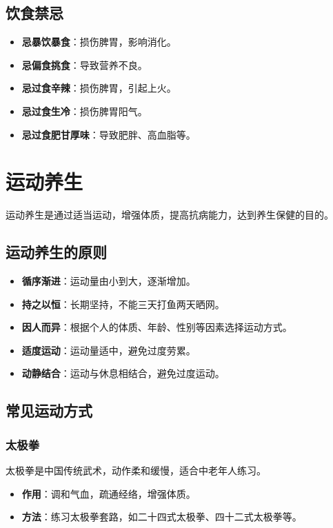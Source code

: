 \documentclass[12pt,UTF8]{ctexbook}
\begin{document}
\subsection{饮食禁忌}

\begin{itemize}
\item \textbf{忌暴饮暴食}：损伤脾胃，影响消化。
\item \textbf{忌偏食挑食}：导致营养不良。
\item \textbf{忌过食辛辣}：损伤脾胃，引起上火。
\item \textbf{忌过食生冷}：损伤脾胃阳气。
\item \textbf{忌过食肥甘厚味}：导致肥胖、高血脂等。
\end{itemize}

\section{运动养生}

运动养生是通过适当运动，增强体质，提高抗病能力，达到养生保健的目的。

\subsection{运动养生的原则}

\begin{itemize}
\item \textbf{循序渐进}：运动量由小到大，逐渐增加。
\item \textbf{持之以恒}：长期坚持，不能三天打鱼两天晒网。
\item \textbf{因人而异}：根据个人的体质、年龄、性别等因素选择运动方式。
\item \textbf{适度运动}：运动量适中，避免过度劳累。
\item \textbf{动静结合}：运动与休息相结合，避免过度运动。
\end{itemize}

\subsection{常见运动方式}

\subsubsection{太极拳}

太极拳是中国传统武术，动作柔和缓慢，适合中老年人练习。

\begin{itemize}
\item \textbf{作用}：调和气血，疏通经络，增强体质。
\item \textbf{方法}：练习太极拳套路，如二十四式太极拳、四十二式太极拳等。
\end{itemize}
\end{document}
